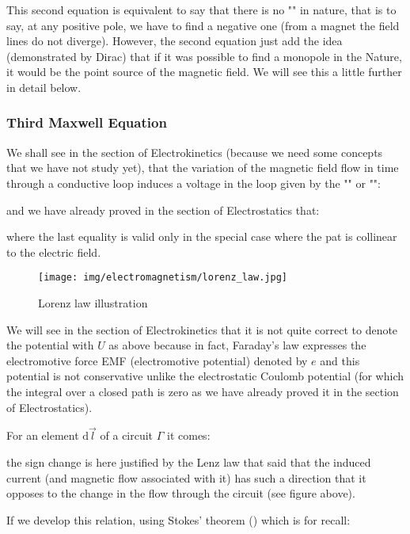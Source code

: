 	This second equation is equivalent to say that there is no "" in nature, that is to say, at any positive pole, we have to find a negative one (from a magnet the field lines do not diverge). However, the second equation just add the idea (demonstrated by Dirac) that if it was possible to find a monopole in the Nature, it would be the point source of the magnetic field. We will see this a little further in detail below.
	
	\subsubsection{Third Maxwell Equation}\label{third maxwell equation}
	We shall see in the section of Electrokinetics (because we need some concepts that we have not study yet), that the variation of the magnetic field flow in time through a conductive loop induces a voltage in the loop given by the "" or "":
	
	and we have already proved in the section of Electrostatics that:
	
	where the last equality is valid only in the special case where the pat is collinear to the electric field.
	\begin{figure}[H]
		\centering
		\texttt{[image: img/electromagnetism/lorenz\_law.jpg]}
		\caption{Lorenz law illustration}
	\end{figure}
	\begin{tcolorbox}[title=Remark,colframe=black,arc=10pt]
	We will see in the section of Electrokinetics that it is not quite correct to denote the potential with $U$ as above because in fact, Faraday's law expresses the electromotive force EMF (electromotive potential) denoted by $e$ and this potential is not conservative unlike the electrostatic Coulomb potential (for which the integral over a closed path is zero as we have already proved it in the section of Electrostatics).
	\end{tcolorbox}
	For an element $\mathrm{d}\vec{l}$ of a circuit $\Gamma$ it comes:
	
	the sign change is here justified by the Lenz law that said that the induced current (and magnetic flow associated with it) has such a direction that it opposes to the change in the flow through the circuit (see figure above).
	
	If we develop this relation, using Stokes' theorem () which is for recall:
	
